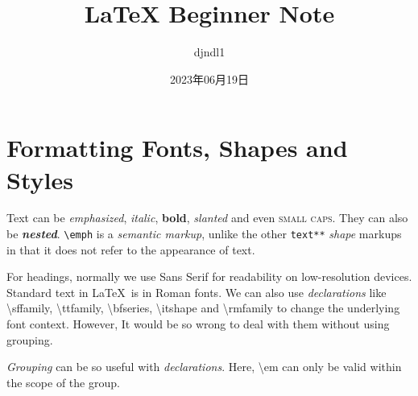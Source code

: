 \documentclass[a4paper,12pt]{article}
\begin{document}
\title{LaTeX Beginner Note}
\author{djndl1}
\date{2023年06月19日}

\maketitle

\section{Formatting Fonts, Shapes and Styles}

Text can be \emph{emphasized}, \textit{italic}, \textbf{bold}, \textsl{slanted} and even \textsc{small caps}. They can also be \textbf{\textit{nested}}.
\texttt{\textbackslash emph} %
is a \emph{semantic markup}, unlike the other
\texttt{text**} \emph{shape}
markups in that it does not refer to the appearance of text.

For headings, normally we use \textsf{Sans Serif} for readability on low-resolution devices. Standard text in \LaTeX\ is in \textrm{Roman fonts}.
We can also use \emph{declarations} like \ttfamily \textbackslash sffamily, \textbackslash ttfamily, \textbackslash bfseries, \textbackslash itshape \normalfont and \ttfamily \textbackslash rmfamily \normalfont to change the underlying font context. However, It would be so wrong to deal with them without using grouping.

{\em Grouping} can be so useful with {\em declarations}. Here, {\ttfamily \textbackslash em} can only be valid within the {\ttfamily scope} of the group.
\end{document}
